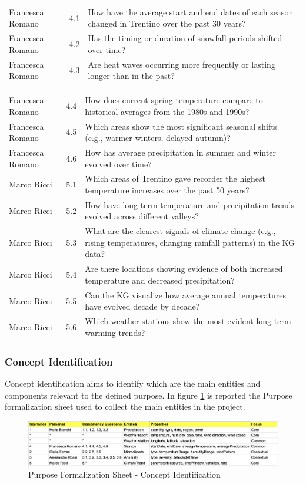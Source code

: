 \begin{tabular}{|p{5cm}|p{1cm}|p{10cm}|}
\hline
Francesca Romano & 4.1 & How have the average start and end dates of each season changed in Trentino over the past 30 years?\\ Francesca Romano & 4.2 & Has the timing or duration of snowfall periods shifted over time? \\ Francesca Romano & 4.3 & Are heat waves occurring more frequently or lasting longer than in the past? \\ 
\hline
\end{tabular}
\begin{tabular}{|p{5cm}|p{1cm}|p{10cm}|}
\hline
Francesca Romano & 4.4 & How does current spring temperature compare to historical averages from the 1980s and 1990s? \\ Francesca Romano & 4.5 & Which areas show the most significant seasonal shifts (e.g., warmer winters, delayed autumn)? \\ Francesca Romano & 4.6 & How has average precipitation in summer and winter evolved over time?\\
\hline
Marco Ricci & 5.1 & Which areas of Trentino gave recorder the highest temperature increases over the past 50 years? \\ Marco Ricci & 5.2 & How have long-term temperature and precipitation trends evolved across different valleys? \\ Marco Ricci & 5.3 & What are the clearest signals of climate change (e.g., rising temperatures, changing rainfall patterns) in the KG data? \\ Marco Ricci & 5.4 & Are there locations showing evidence of both increased temperature and decreased precipitation? \\ Marco Ricci & 5.5 & Can the KG visualize how average annual temperatures have evolved decade by decade? \\ Marco Ricci & 5.6 & Which weather stations show the most evident long-term warming trends? \\
\hline
\end{tabular}
\subsubsection{Concept Identification}
Concept identification aims to identify which are the main entities and components relevant to the defined purpose. In figure \ref{fig:purpose_formalization_sheet} is reported the Purpose formalization sheet used to collect the main entities in the project.
\begin{figure}[h]
    \centering
    \includegraphics[width=1\textwidth]{../knowdive-files/purpose_formalization_sheet.png}
    \caption{Purpose Formalization Sheet - Concept Identification}
    \label{fig:purpose_formalization_sheet}
\end{figure}
